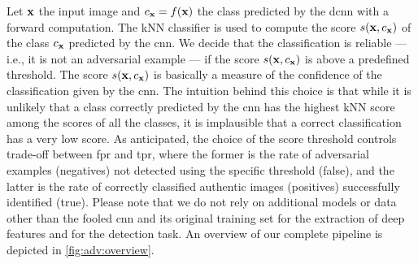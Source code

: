 


Let $\mathbf{x}$ the input image and $c_{\mathbf{x}} = f(\mathbf{x})$ the class predicted by the \gls{dcnn} with a forward computation.
The kNN classifier is used to compute the score $s(\mathbf{x},c_{\mathbf{x}})$ of the class $c_{\mathbf{x}}$ predicted by the \gls{cnn}.
We decide that the classification is reliable --- i.e., it is not an adversarial example --- if the score $s(\mathbf{x},c_{\mathbf{x}})$ is above a predefined threshold.
The score $s(\mathbf{x}, c_{\mathbf{x}})$ is basically a measure of the confidence of the classification given by the \gls{cnn}.
The intuition behind this choice is that while it is unlikely that a class correctly predicted by the \gls{cnn} has the highest kNN score among the scores of all the classes, it is implausible that a correct classification has a very low score.
As anticipated, the choice of the score threshold controls trade-off between \acrfull{fpr} and \acrfull{tpr}, where the former is the rate of adversarial examples (negatives) not detected using the specific threshold (false), and the latter is the rate of correctly classified authentic images (positives) successfully identified (true).
Please note that we do not rely on additional models or data other than the fooled \gls{cnn} and its original training set for the extraction of deep features and for the detection task.
An overview of our complete pipeline is depicted in \ref{fig:adv:overview}.



